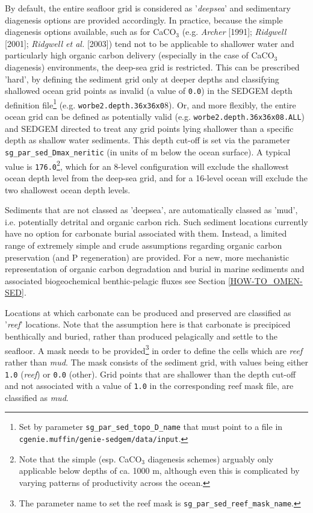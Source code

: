 \documentclass[11pt,fleqn]{book} %
\begin{document}
By default, the entire seafloor grid is considered as '\textit{deepsea}' and sedimentary diagenesis options are provided accordingly. In practice, because the simple diagenesis options available, such as for CaCO\(_{3}\) (e.g. \textit{Archer} [1991]; \textit{Ridgwell} [2001]; \textit{Ridgwell et al.} [2003]) tend not to be applicable to shallower water and particularly high organic carbon delivery (especially in the case of CaCO\(_{3}\) diagenesis) environments, the deep-sea grid is restricted. This can be prescribed 'hard', by defining the sediment grid only at deeper depths and classifying shallowed ocean grid points as invalid (a value of \texttt{0.0}) in the SEDGEM depth definition file\footnote{Set by parameter \texttt{sg\_par\_sed\_topo\_D\_name} that must point to a file in \texttt{cgenie.muffin/genie-sedgem/data/input}.} (e.g. \texttt{worbe2.depth.36x36x0}8).
 Or, and more flexibly, the entire ocean grid can be defined as potentially valid (e.g. \texttt{worbe2.depth.36x36x08.ALL}) and SEDGEM directed to treat any grid points lying shallower than a specific depth as shallow water sediments. This depth cut-off is set via the parameter \texttt{sg\_par\_sed\_Dmax\_neritic} (in units of m below the ocean surface). A typical value is \texttt{176.0}\footnote{Note that the simple (esp. CaCO\(_{3}\) diagenesis schemes) arguably only applicable below depths of ca. 1000 m, although even this is complicated by varying patterns of productivity across the ocean.}, which for an 8-level configuration will exclude the shallowest ocean depth level from the deep-sea grid, and for a 16-level ocean will exclude the two shallowest ocean depth levels.

Sediments that are not classed as 'deepsea', are automatically classed as 'mud', i.e. potentially detrital and organic carbon rich. Such sediment locations  currently have no option for carbonate burial associated with them. Instead, a limited range of extremely simple and crude assumptions regarding organic carbon preservation (and P regeneration) are provided. 
For a new, more mechanistic representation of organic carbon degradation and burial in marine sediments and associated biogeochemical benthic-pelagic fluxes see Section \ref{HOW-TO_OMEN-SED}.

Locations at which  carbonate can be produced and preserved
are classified
as '\textit{reef}' locations. Note that the assumption here is that carbonate is precipiced benthically and buried, rather than produced pelagically and  settle to the seafloor.
A mask needs to be provided\footnote{The parameter name to set the reef mask is \texttt{sg\_par\_sed\_reef\_mask\_name}.} in order to define the cells which are \textit{reef} rather than \textit{mud}. The mask consists of the sediment grid, with values being either \texttt{1.0} (\textit{reef}) or \texttt{0.0} (other).  Grid points that are shallower than the depth cut-off and not associated with a value of \texttt{1.0} in the corresponding reef mask file, are classified as \textit{mud}.
\end{document}
